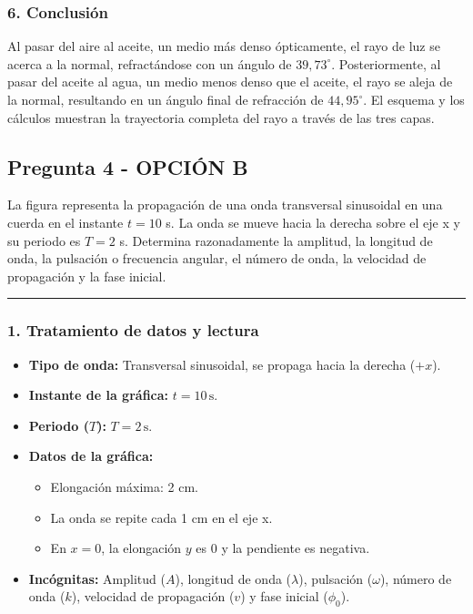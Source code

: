 \subsubsection*{6. Conclusión}
\begin{cajaconclusion}
    Al pasar del aire al aceite, un medio más denso ópticamente, el rayo de luz se acerca a la normal, refractándose con un ángulo de $39,73^{\circ}$. Posteriormente, al pasar del aceite al agua, un medio menos denso que el aceite, el rayo se aleja de la normal, resultando en un ángulo final de refracción de $44,95^{\circ}$. El esquema y los cálculos muestran la trayectoria completa del rayo a través de las tres capas.
\end{cajaconclusion}
\newpage

\subsection{Pregunta 4 - OPCIÓN B}
\label{subsec:4B_2025_jul_ext}

\begin{cajaenunciado}
La figura representa la propagación de una onda transversal sinusoidal en una cuerda en el instante $t=10$ s. La onda se mueve hacia la derecha sobre el eje x y su periodo es $T=2$ s. Determina razonadamente la amplitud, la longitud de onda, la pulsación o frecuencia angular, el número de onda, la velocidad de propagación y la fase inicial.
\end{cajaenunciado}
\hrule

\subsubsection*{1. Tratamiento de datos y lectura}
\begin{itemize}
    \item \textbf{Tipo de onda:} Transversal sinusoidal, se propaga hacia la derecha ($+x$).
    \item \textbf{Instante de la gráfica:} $t = 10 \, \text{s}$.
    \item \textbf{Periodo ($T$):} $T = 2 \, \text{s}$.
    \item \textbf{Datos de la gráfica:}
        \begin{itemize}
            \item Elongación máxima: 2 cm.
            \item La onda se repite cada 1 cm en el eje x.
            \item En $x=0$, la elongación $y$ es 0 y la pendiente es negativa.
        \end{itemize}
    \item \textbf{Incógnitas:} Amplitud ($A$), longitud de onda ($\lambda$), pulsación ($\omega$), número de onda ($k$), velocidad de propagación ($v$) y fase inicial ($\phi_0$).
\end{itemize}

